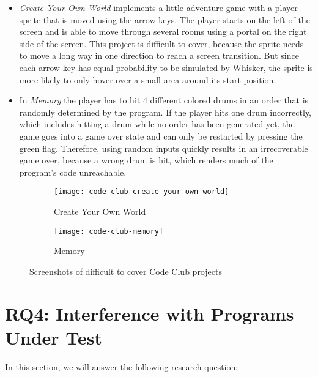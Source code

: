 \begin{itemize}
    \item \textit{Create Your Own World} implements a little adventure game with a player sprite that is moved using the arrow keys.
        The player starts on the left of the screen and is able to move through several rooms using a portal on the right side of the screen.
        This project is difficult to cover, because the sprite needs to move a long way in one direction to reach a screen transition.
        But since each arrow key has equal probability to be simulated by Whisker, the sprite is more likely to only hover over a small area around its start position.
    \item In \textit{Memory} the player has to hit 4 different colored drums in an order that is randomly determined by the program.
        If the player hits one drum incorrectly, which includes hitting a drum while no order has been generated yet,
        the game goes into a game over state and can only be restarted by pressing the green flag.
        Therefore, using random inputs quickly results in an irrecoverable game over,
        because a wrong drum is hit, which renders much of the program's code unreachable.
\end{itemize}

\begin{figure}[htpb]
    \centering

    \begin{subfigure}{.3\textwidth}
        \centering
        \texttt{[image: code-club-create-your-own-world]}
        \caption{Create Your Own World}
    \end{subfigure}
    \hspace{1mm}
    \begin{subfigure}{.3\textwidth}
        \centering
        \texttt{[image: code-club-memory]}
        \caption{Memory}
    \end{subfigure}%

    \caption{Screenshots of difficult to cover Code Club projects}
    \label{fig:difficult_code_club_projects}
\end{figure}

\section{RQ4: Interference with Programs Under Test}
\label{sec:rq4}

In this section, we will answer the following research question:

